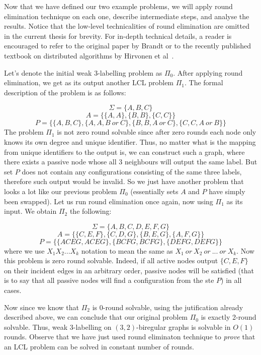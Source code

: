 Now that we have defined our two example problems,
we will apply round elimination
technique on each one, describe intermediate steps, and analyse the results.
Notice that the low-level technicalities of round elimination
are omitted in the current thesis for brevity. For in-depth technical details, a reader is encouraged
to refer to the original paper by Brandt or to the recently published textbook on distributed algorithms
by Hirvonen et al~\cite{Brandt2019, Hirvonen2020}.

Let's denote the initial weak 3-labelling problem as $\Pi_0$. After applying round elimination, we get as its
output another LCL problem $\Pi_1$. The formal description of the problem is as follows:

$$\Sigma = \{A, B, C\}$$
$$A = \{ \{A, A\}, \{B, B\}, \{C, C\}\}$$
$$P = \{ \{A, B ,C\}, \{A, A, B~or~C\}, \{B, B, A~or~C\}, \{C, C, A~or~B\} \}$$
The problem $\Pi_1$ is not zero round solvable since after zero rounds each node only
knows its own degree and unique identifier. Thus, no matter what is the mapping from
unique identifiers to the output is, we can construct such a graph, where there exists
a passive node whose all 3 neighbours will output the same label. But set $P$ does not
contain any configurations consisting of the same three labels, therefore such
output would be invalid. So we just have another problem that looks a lot like our
previous problem $\Pi_0$ (essentially sets $A$ and $P$ have simply been swapped).
Let us run round elimination once again, now using $\Pi_1$ as its input. We obtain
$\Pi_2$ the following:

$$\Sigma = \{A, B, C, D, E, F, G\}$$
$$A = \{ \{C, E, F\}, \{C, D, G\}, \{B, E, G\}, \{A, F, G\}\}$$
$$P = \{ \{ACEG, ACEG\}, \{BCFG, BCFG\}, \{DEFG, DEFG\} \}$$
where we use $X_1X_2...X_k$ notation to mean the same as $X_1~or~X_2~or~...~or~X_k$.
Now this problem is zero round solvable. Indeed, if all active nodes output $\{C, E, F\}$
on their incident edges in an arbitrary order, passive nodes will be satisfied (that is to say
that all passive nodes will find a configuration from the ste $P$) in all cases.

Now since we know that $\Pi_2$ is 0-round solvable, using the jutification already described
above, we can conclude that our original problem $\Pi_0$ is exactly 2-round solvable. Thus,
weak 3-labelling on $(3, 2)$-biregular graphs is solvable in $O(1)$ rounds. Observe that
we have just used round eliminaton technique to \emph{prove} that an LCL problem can be
solved in constant number of rounds.

